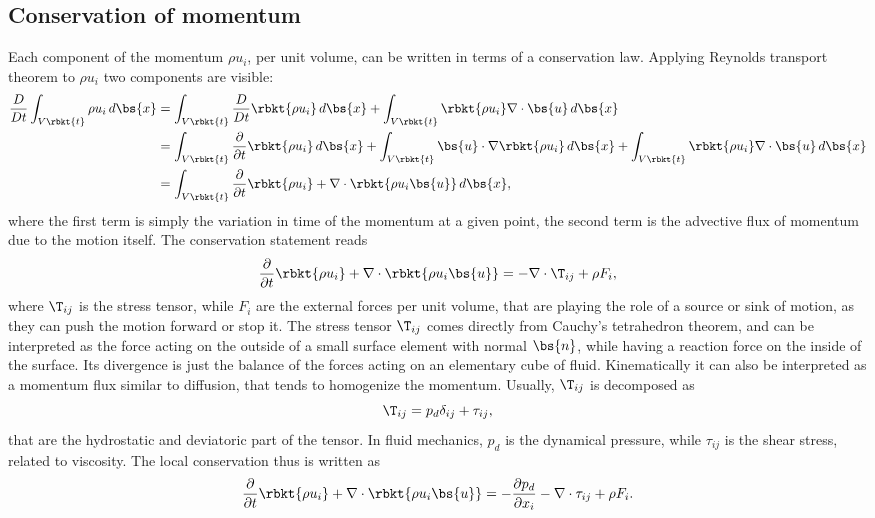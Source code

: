 \subsection{Conservation of momentum}
Each component of the momentum $\rho u_{i}$, per unit volume, can be written in terms of a conservation law. Applying Reynolds transport theorem to $\rho u_{i}$ two components are visible:
\begin{align*}
    \dfrac{D}{Dt}\int_{V\rbkt{t}} \rho u_{i}\,d\bs{x}&=
    \int_{V\rbkt{t}} \dfrac{D}{Dt}\rbkt{\rho u_{i}}\,d\bs{x} + \int_{V\rbkt{t}} \rbkt{\rho u_{i}}\nabla\cdot\bs{u}\,d\bs{x}\\
    &=\int_{V\rbkt{t}} \dfrac{\partial}{\partial t}\rbkt{\rho u_{i}}\,d\bs{x}  + \int_{V\rbkt{t}} \bs{u}\cdot\nabla\rbkt{\rho u_{i}}\,d\bs{x} + \int_{V\rbkt{t}} \rbkt{\rho u_{i}}\nabla\cdot\bs{u}\,d\bs{x}\\
    &=\int_{V\rbkt{t}} \dfrac{\partial}{\partial t}\rbkt{\rho u_{i}} + \nabla\cdot\rbkt{\rho u_{i}\bs{u}}\,d\bs{x},
\end{align*}
where the first term is simply the variation in time of the momentum at a given point, the second term is the advective flux of momentum due to the motion itself. The conservation statement reads
\begin{equation}
    \dfrac{\partial}{\partial t}\rbkt{\rho u_{i}} + \nabla\cdot\rbkt{\rho u_{i}\bs{u}} = -\nabla\cdot\T_{ij} + \rho F_{i},
\end{equation}
where $\T_{ij}$ is the stress tensor, while $F_{i}$ are the external forces per unit volume, that are playing the role of a source or sink of motion, as they can push the motion forward or stop it. The stress tensor $\T_{ij}$ comes directly from Cauchy's tetrahedron theorem, and can be interpreted as the force acting on the outside of a small surface element with normal $\bs{n}$, while having a reaction force on the inside of the surface. Its divergence is just the balance of the forces acting on an elementary cube of fluid. Kinematically it can also be interpreted as a momentum flux similar to diffusion, that tends to homogenize the momentum. Usually, $\T_{ij}$ is decomposed as
\begin{equation}
    \T_{ij} = p_{d}\delta_{ij} + \tau_{ij},
\end{equation}
that are the hydrostatic and deviatoric part of the tensor. In fluid mechanics, $p_{d}$ is the dynamical pressure, while $\tau_{ij}$ is the shear stress, related to viscosity. The local conservation thus is written as 
\begin{equation}\label{eq:conservation_momentum}
    \dfrac{\partial}{\partial t}\rbkt{\rho u_{i}} + \nabla\cdot\rbkt{\rho u_{i}\bs{u}} = -\dfrac{\partial p_{d}}{\partial x_{i}} -\nabla\cdot\tau_{ij} + \rho F_{i}.
\end{equation}
